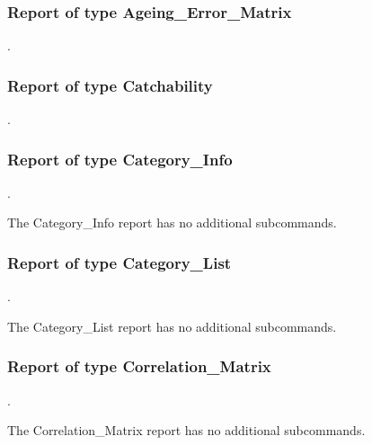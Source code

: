 
\subsubsection{Report of type Ageing\_Error\_Matrix}
.
\label{syntax:Report-AgeingErrorMatrix}


\subsubsection{Report of type Catchability}
.
\label{syntax:Report-Catchability}


\subsubsection{Report of type Category\_Info}
.
\label{syntax:Report-CategoryInfo}

The Category\_Info report has no additional subcommands.

\subsubsection{Report of type Category\_List}
.
\label{syntax:Report-CategoryList}

The Category\_List report has no additional subcommands.

\subsubsection{Report of type Correlation\_Matrix}
.
\label{syntax:Report-CorrelationMatrix}

The Correlation\_Matrix report has no additional subcommands.

